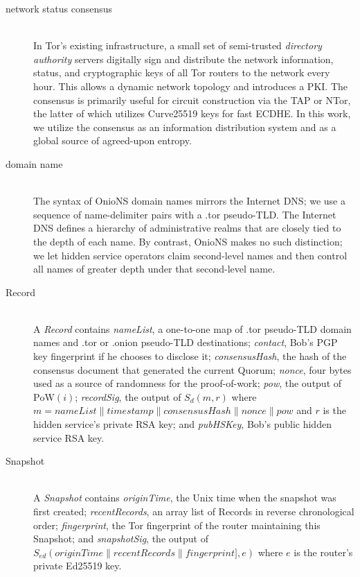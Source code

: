 \documentclass{sig-alternate}
\newcommand*\concat{\mathbin{\|}}
\begin{document}
\begin{description}
	\item[network status consensus] \hfill \\
		In Tor's existing infrastructure, a small set of semi-trusted \textit{directory authority} servers digitally sign and distribute the network information, status, and cryptographic keys of all Tor routers to the network every hour. This allows a dynamic network topology and introduces a PKI. The consensus is primarily useful for circuit construction via the TAP\cite{goldberg2006security} or NTor\cite{goldberg2013anonymity}, the latter of which utilizes Curve25519\cite{bernstein2006curve25519} keys for fast ECDHE. In this work, we utilize the consensus as an information distribution system and as a global source of agreed-upon entropy.
		
	\item[domain name] \hfill \\
		The syntax of OnioNS domain names mirrors the Internet DNS; we use a sequence of name-delimiter pairs with a .tor pseudo-TLD. The Internet DNS defines a hierarchy of administrative realms that are closely tied to the depth of each name. By contrast, OnioNS makes no such distinction; we let hidden service operators claim second-level names and then control all names of greater depth under that second-level name.

	\item[Record] \hfill \\
		A \emph{Record} contains \emph{nameList}, a one-to-one map of .tor pseudo-TLD domain names and .tor or .onion pseudo-TLD destinations; \emph{contact}, Bob's PGP key fingerprint if he chooses to disclose it; \emph{consensusHash}, the hash of the consensus document that generated the current Quorum; \emph{nonce}, four bytes used as a source of randomness for the proof-of-work; \emph{pow}, the output of $ \mathrm{PoW}(i) $; \emph{recordSig}, the output of $ S_{d}(m, r) $ where $ m = \mathit{nameList} \concat \mathit{timestamp} \concat \mathit{consensusHash} \concat \mathit{nonce} \concat \mathit{pow} $ and $ r $ is the hidden service's private RSA key; and \emph{pubHSKey}, Bob's public hidden service RSA key.

	\item[Snapshot] \hfill \\
		A \emph{Snapshot} contains \emph{originTime}, the Unix time when the snapshot was first created; \emph{recentRecords}, an array list of Records in reverse chronological order; \emph{fingerprint}, the Tor fingerprint of the router maintaining this Snapshot; and  \emph{snapshotSig}, the output of $ S_{\mathit{ed}}(\mathit{originTime} \concat \mathit{recentRecords} \concat \mathit{fingerprint}], e) $ where $ e $ is the router's private Ed25519 key.


\end{description}
\end{document}
